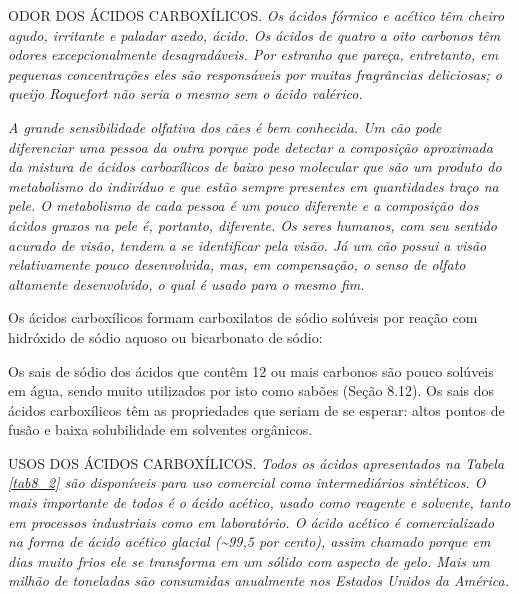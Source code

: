 \par\bigskip
\noindent ODOR DOS ÁCIDOS CARBOXÍLICOS. \emph{Os ácidos fórmico e acético têm cheiro agudo, irritante e paladar azedo, ácido. Os ácidos de quatro a oito carbonos têm odores excepcionalmente desagradáveis. Por estranho que pareça, entretanto, em pequenas concentrações eles são responsáveis por muitas fragrâncias deliciosas; o queijo Roquefort não seria o mesmo sem o ácido valérico.}

\emph{A grande sensibilidade olfativa dos cães é bem conhecida. Um cão pode diferenciar uma pessoa da outra porque pode detectar a composição aproximada da mistura de ácidos carboxílicos de baixo peso molecular que são um produto do metabolismo do indivíduo e que estão sempre presentes em quantidades traço na pele. O metabolismo de cada pessoa é um pouco diferente e a composição dos ácidos graxos na pele é, portanto, diferente. Os seres humanos, com seu sentido acurado de visão, tendem a se identificar pela visão. Já um cão possui a visão relativamente pouco desenvolvida, mas, em compensação, o senso de olfato altamente desenvolvido, o qual é usado para o mesmo fim.}
\par\bigskip

Os ácidos carboxílicos formam carboxilatos de sódio solúveis por reação com hidróxido de sódio aquoso ou bicarbonato de sódio: 

\begin{tightcenter}
\end{tightcenter}

\noindent Os sais de sódio dos ácidos que contêm 12 ou mais carbonos são pouco solúveis em água, sendo muito utilizados por isto como sabões (Seção 8.12). Os sais dos ácidos carboxílicos têm as propriedades que seriam de se esperar: altos pontos de fusão e baixa solubilidade em solventes orgânicos.

\par\bigskip
\noindent USOS DOS ÁCIDOS CARBOXÍLICOS. \emph{Todos os ácidos apresentados na Tabela \ref{tab8_2} são disponíveis para uso comercial como intermediários sintéticos. O mais importante de todos é o ácido acético, usado como reagente e solvente, tanto em processos industriais como em laboratório. O ácido acético é comercializado na forma de ácido acético glacial (\sim 99,5 por cento), assim chamado porque em dias muito frios ele se transforma em um sólido com aspecto de gelo. Mais um milhão de toneladas são consumidas anualmente nos Estados Unidos da América.}

